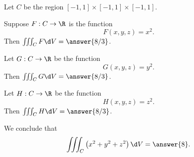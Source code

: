 \documentclass{ximera}
\author{Jim Fowler}
\begin{document}
\begin{exercise}
  Let $C$ be the region $[-1,1] \times [-1,1] \times [-1,1]$.

  Suppose $F : C \to \R$ is the function
  \[
    F(x,y,z) = x^2.
  \]
  Then $\iiint_C F \d V = \answer{8/3}$.

  Let $G : C \to \R$ be the function
  \[
    G(x,y,z) = y^2.
  \]
  Then $\iiint_C G \d V = \answer{8/3}$.

  Let $H : C \to \R$ be the function
  \[
    H(x,y,z) = z^2.
  \]
  Then $\iiint_C H \d V = \answer{8/3}$.

  We conclude that
  \[
    \iiint_C \left( x^2 + y^2 + z^2 \right) \d V = \answer{8}.
  \]

\end{exercise}
\end{document}
